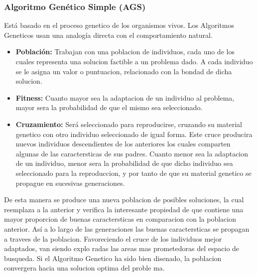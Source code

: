 \documentclass[12pt]{article}
\begin{document}
\subsubsection*{Algoritmo Genético Simple (AGS)}
Está basado en el proceso genetico de los organismos vivos. 
Los Algoritmos Geneticos usan una analogía directa con el comportamiento natural. 
\begin{itemize}
    \item \textbf{Población:} Trabajan con una poblacion de individuos, cada uno de los cuales representa una solucion factible a un problema dado. A cada individuo se le asigna un valor
 o puntuacion, relacionado con la bondad de dicha solucion. 
    \item \textbf{Fitness:} Cuanto mayor sea la adaptacion de un individuo al problema, mayor
 sera la probabilidad de que el mismo sea seleccionado.
    \item \textbf{Cruzamiento:} Será seleccionado para reproducirse, cruzando su material genetico con otro individuo seleccionado de igual forma. Este cruce producira nuevos individuos descendientes de los anteriores los cuales comparten algunas de las caractersticas de sus padres. Cuanto menor sea la adaptacion de un
 individuo, menor sera la probabilidad de que dicho individuo sea seleccionado para
 la reproduccion, y por tanto de que su material genetico se propague en sucesivas
 generaciones.\cite{ref7}
\end{itemize}
 
 De esta manera se produce una nueva poblacion de posibles soluciones, la cual reemplaza a la anterior y verifica  la interesante propiedad de que contiene una mayor
 proporcion de buenas caractersticas en comparacion con la poblacion anterior. Así a
 lo largo de las generaciones las buenas caractersticas se propagan a travees de la
 poblacion. Favoreciendo el cruce de los individuos mejor adaptados, van siendo explo
radas las areas mas prometedoras del espacio de busqueda. Si el Algoritmo Genetico
 ha sido bien disenado, la poblacion convergera hacia una solucion optima del proble
ma.
\end{document}
